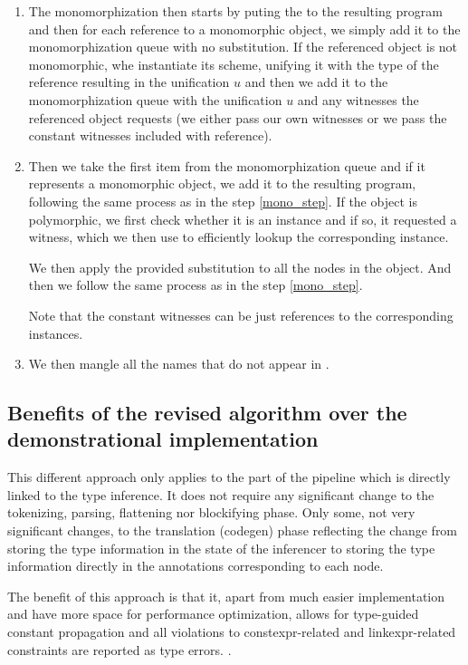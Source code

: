 \begin{enumerate}
    \item The monomorphization then starts by puting the  to the resulting program and then for each reference to a monomorphic object, we simply add it to the monomorphization queue with no substitution. If the referenced object is not monomorphic, whe instantiate its scheme, unifying it with the type of the reference resulting in the unification $u$ and then we add it to the monomorphization queue with the unification $u$ and any witnesses the referenced object requests (we either pass our own witnesses or we pass the constant witnesses included with reference). \label{mono_step}

    \item Then we take the first item from the monomorphization queue and if it represents a monomorphic object, we add it to the resulting program, following the same process as in the step \ref{mono_step}. If the object is polymorphic, we first check whether it is an instance and if so, it requested a witness, which we then use to efficiently lookup the corresponding instance.

    We then apply the provided substitution to all the nodes in the object. And then we follow the same process as in the step \ref{mono_step}.

    Note that the constant witnesses can be just references to the corresponding instances.

    \item We then mangle all the names that do not appear in .
\end{enumerate}

\subsection{Benefits of the revised algorithm over the demonstrational implementation}

This different approach only applies to the part of the pipeline which is directly linked to the type inference. It does not require any significant change to the tokenizing, parsing, flattening nor blockifying phase. Only some, not very significant changes, to the translation (codegen) phase reflecting the change from storing the type information in the state of the inferencer to storing the type information directly in the annotations corresponding to each node.

The benefit of this approach is that it, apart from much easier implementation and have more space for performance optimization, allows for type-guided constant propagation and all violations to constexpr-related and linkexpr-related constraints are reported as type errors. .


